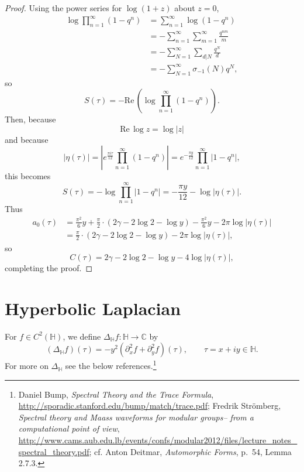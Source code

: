 \documentclass{article}
\def\Re{\ensuremath{\mathrm{Re}}\,}
\theoremstyle{definition}
\theoremstyle{definition}
\begin{document}
\begin{proof}
Using the power series for $\log(1+z)$ about $z=0$,
\begin{align*}
\log \prod_{n=1}^\infty (1-q^n)&=\sum_{n=1}^\infty \log(1-q^n)\\
&=-\sum_{n=1}^\infty \sum_{m=1}^\infty \frac{q^{nm}}{m}\\
&=-\sum_{N=1}^\infty \sum_{d|N} \frac{q^N}{d}\\
&=-\sum_{N=1}^\infty \sigma_{-1}(N) q^N,
\end{align*}
so
\[
S(\tau) = -\Re\left( \log \prod_{n=1}^\infty (1-q^n) \right).
\]
Then, because
\[
\Re \log z = \log |z|
\]
 and because
\[
|\eta(\tau)| = \left| e^{\frac{\pi i \tau}{12}} \prod_{n=1}^\infty (1-q^n) \right|=
e^{-\frac{\pi y}{12}} \prod_{n=1}^\infty |1-q^n|,
\]
this becomes
\[
S(\tau)=-\log \prod_{n=1}^\infty |1-q^n|
=-\frac{\pi y}{12}-\log |\eta(\tau)|.
\]
Thus
\begin{align*}
a_0(\tau) &= \frac{\pi^2}{6}y+\frac{\pi}{2}\cdot (2\gamma-2\log 2-\log y)
-\frac{\pi^2}{6}y-2\pi \log |\eta(\tau)|\\
&=\frac{\pi}{2}\cdot (2\gamma-2\log 2 -\log y)-2\pi \log |\eta(\tau)|,
\end{align*}
so
\[
C(\tau) = 2\gamma-2\log 2-\log y - 4 \log|\eta(\tau)|,
\]
completing the proof.
\end{proof}


\section{Hyperbolic Laplacian}
For $f \in C^2(\mathbb{H})$, we define $\Delta_{\mathbb{H}} f:\mathbb{H} \to \mathbb{C}$ by
\[
(\Delta_{\mathbb{H}} f)(\tau) = -y^2(\partial_x^2 f + \partial_y^2 f)(\tau), 
\qquad \tau = x+iy \in \mathbb{H}.
\]
For more on $\Delta_{\mathbb{H}}$ see the below references.\footnote{Daniel Bump, {\em Spectral Theory and the Trace Formula},
\url{http://sporadic.stanford.edu/bump/match/trace.pdf};
Fredrik Str\"omberg, {\em Spectral theory and Maass waveforms for modular groups--
from a computational point of view},
\url{http://www.cams.aub.edu.lb/events/confs/modular2012/files/lecture_notes_spectral_theory.pdf}; cf. Anton Deitmar, {\em Automorphic Forms},
p.~54, Lemma 2.7.3.}
\end{document}
